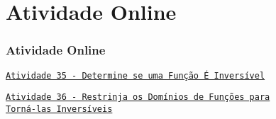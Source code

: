 \section{Atividade Online}
\begin{frame}
\frametitle{Atividade Online} 

\href{https://pt.khanacademy.org/math/algebra2/manipulating-functions/invertible-functions/e/inverse-domain-range}
{{\tt Atividade 35 - Determine se uma Função É Inversível}}

\href{https://pt.khanacademy.org/math/algebra2/manipulating-functions/invertible-functions/e/restrict-the-domains-of-functions}
{{\tt Atividade 36 - Restrinja os Domínios de Funções para\\ Torná-las
Inversíveis}}


\end{frame}